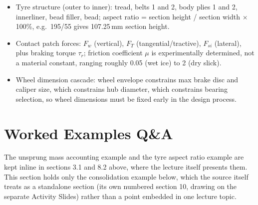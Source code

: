 \documentclass[10pt,a4paper]{article}
\begin{document}
\begin{itemize}
\item Tyre structure (outer to inner): tread, belts 1 and 2, body plies 1 and 2, innerliner, bead filler, bead; aspect ratio = section height / section width $\times$ 100\%, e.g.\ 195/55 gives 107.25\,mm section height.
\item Contact patch forces: $F_w$ (vertical), $F_T$ (tangential/tractive), $F_{si}$ (lateral), plus braking torque $\tau_r$; friction coefficient $\mu$ is experimentally determined, not a material constant, ranging roughly 0.05 (wet ice) to 2 (dry slick).
\item Wheel dimension cascade: wheel envelope constrains max brake disc and caliper size, which constrains hub diameter, which constrains bearing selection, so wheel dimensions must be fixed early in the design process.
\end{itemize}

\section{Worked Examples Q\&A}

The unsprung mass accounting example and the tyre aspect ratio example are kept inline in sections 3.1 and 8.2 above, where the lecture itself presents them. This section holds only the consolidation example below, which the source itself treats as a standalone section (its own numbered section 10, drawing on the separate Activity Slides) rather than a point embedded in one lecture topic.
\end{document}
